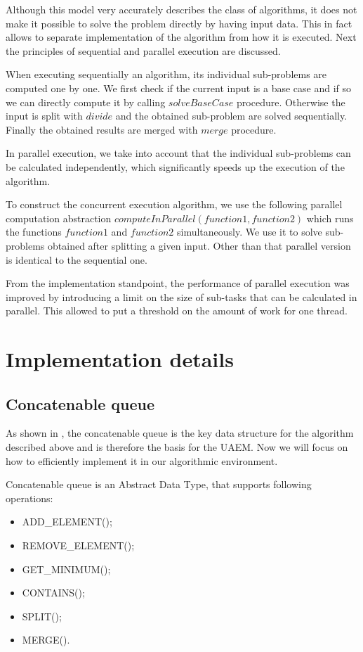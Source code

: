 \documentclass[conference]{IEEEtran}
\begin{document}
	Although this model very accurately describes the class of algorithms, it does not make it possible to solve the problem directly by having input data. This in fact allows to separate implementation of the algorithm from how it is executed. Next the principles of sequential and parallel execution are discussed.
	
	When executing sequentially an algorithm, its individual sub-problems are computed one by one. We first check if the current input is a base case and if so we can directly compute it by calling $solveBaseCase$ procedure. Otherwise the input is split with $divide$ and the obtained sub-problem are solved sequentially. Finally the obtained results are merged with $merge$ procedure.
	
	In parallel execution, we take into account that the individual sub-problems can be calculated independently, which significantly speeds up the execution of the algorithm.
	
	To construct the concurrent execution algorithm, we use the following parallel computation abstraction $computeInParallel(function1, function2)$ which runs the functions $function1$ and $function2$ simultaneously. We use it to solve sub-problems obtained after splitting a given input. Other than that parallel version is identical to the sequential one.
	
	From the implementation standpoint, the performance of parallel execution was improved by introducing a limit on the size of sub-tasks that can be calculated in parallel. This allowed to put a threshold on the amount of work for one thread.
	
\section{Implementation details}
\label{sec:implementation-details}
\subsection{Concatenable queue}

	As shown in \cite{overmars}, the concatenable queue is the key data structure for the algorithm described above and is therefore the basis for the UAEM. Now we will focus on how to efficiently implement it in our algorithmic environment.
	
	Concatenable queue is an Abstract Data Type, that supports following operations:
	
	\begin{itemize}
		\item
		ADD\_ELEMENT();
		\item
		REMOVE\_ELEMENT();
		\item
		GET\_MINIMUM();
		\item
		CONTAINS();
		\item
		SPLIT();
		\item
		MERGE().
	\end{itemize}
	
\end{document}
